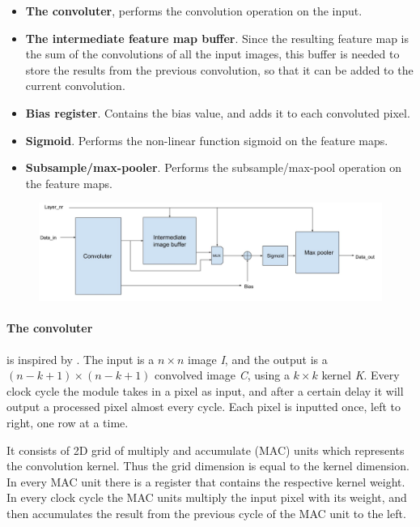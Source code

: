 \begin{itemize}
	\item \textbf{The convoluter}, performs the convolution operation on the input.
	\item \textbf{The intermediate feature map buffer}. Since the resulting feature map is the sum of the convolutions of all the input images, this buffer is needed to store the results from the previous convolution, so that it can be added to the current convolution. 
	\item \textbf{Bias register}. Contains the bias value, and adds it to each convoluted pixel. 
	\item \textbf{Sigmoid}. Performs the non-linear function sigmoid on the feature maps.
	\item \textbf{Subsample/max-pooler}. Performs the subsample/max-pool operation on the feature maps. 
\end{itemize}

\begin{figure}[h!]
  \centering
      \includegraphics[width=1.0\textwidth]{Figures/Method/conv_layer_arch}
  \caption{}
\end{figure}


\paragraph{The convoluter} is inspired by \cite{Farabet2009}. The input is a $ n \times n $ image \textit{I}, and the output is a $ (n-k+1) \times (n-k+1) $ convolved image \textit{C}, using a $ k \times k $ kernel \textit{K}. Every clock cycle the module takes in a pixel as input, and after a certain delay it will output a processed pixel almost every cycle. Each pixel is inputted once, left to right, one row at a time. 

It consists of 2D grid of multiply and accumulate (MAC) units which represents the convolution kernel. Thus the grid dimension is equal to the kernel dimension. In every MAC unit there is a register that contains the respective kernel weight. In every clock cycle the MAC units multiply the input pixel with its weight, and then accumulates the result from the previous cycle of the MAC unit to the left. 

